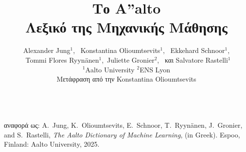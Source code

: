 \documentclass[journal,12pt,onecolumn]{article}
\begin{document}


\title {\vspace*{8mm}
	{\huge {\bf \foreignlanguage{greek}{Το} {\fontsize{40}{48}\selectfont \textbf{\textsf{A\hspace*{-2mm}''}}}\hspace*{-4mm}alto \\ \foreignlanguage{greek}{Λεξικό της Μηχανικής Μάθησης}}}  \\[-5mm] 
}


\author{\hspace{-2mm}Alexander Jung${}^{1}$, \ Konstantina Olioumtsevits${}^{1}$, \ Ekkehard Schnoor${}^{1}$, \\[-2mm]  
	\ Tommi Flores Ryynänen${}^{1}$,\ Juliette Gronier${}^{2}$, \ \foreignlanguage{greek}{και} Salvatore Rastelli${}^{1}$ \\[-2mm]
	${}^{1}$Aalto University \quad ${}^{2}$ENS Lyon \\
\hspace{-2mm}\foreignlanguage{greek}{Μετάφραση από την} Konstantina Olioumtsevits \\[-2mm]
}

\maketitle
	\begin{center}
		\\[10mm]
{\large	\foreignlanguage{greek}{αναφορά ως}: A.\ Jung, K.\ Olioumtsevits, E.\ Schnoor, T.\ Ryynänen, J.\ Gronier, and S.\ Rastelli, \textit{The Aalto Dictionary of Machine Learning}, (in Greek). Espoo, Finland: Aalto University, 2025.}
\end{center}

\newpage 
{}\
\end{document}
